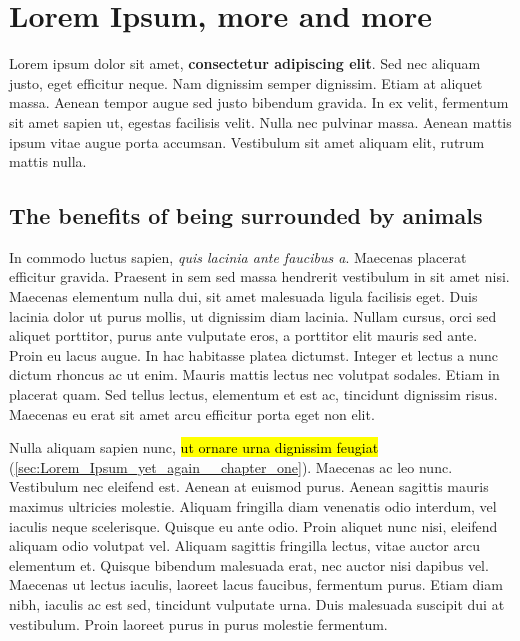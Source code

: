 \chapter{Lorem Ipsum, more and more}
\label{sec:Lorem_Ipsum,_more_and_more__chapter_two}

Lorem ipsum dolor sit amet, \textbf{consectetur adipiscing elit}. Sed nec aliquam justo, eget efficitur neque. Nam dignissim semper dignissim. Etiam at aliquet massa. Aenean tempor augue sed justo bibendum gravida. In ex velit, fermentum sit amet sapien ut, egestas facilisis velit. Nulla nec pulvinar massa. Aenean mattis ipsum vitae augue porta accumsan. Vestibulum sit amet aliquam elit, rutrum mattis nulla.

\section{The benefits of being surrounded by animals}
\label{sec:The_benefits_of_being_surrounded_by_animals__chapter_two}
In commodo luctus sapien, \textit{quis lacinia ante faucibus a}. Maecenas placerat efficitur gravida. Praesent in sem sed massa hendrerit vestibulum in sit amet nisi. Maecenas elementum nulla dui, sit amet malesuada ligula facilisis eget. Duis lacinia dolor ut purus mollis, ut dignissim diam lacinia. Nullam cursus, orci sed aliquet porttitor, purus ante vulputate eros, a porttitor elit mauris sed ante. Proin eu lacus augue. In hac habitasse platea dictumst. Integer et lectus a nunc dictum rhoncus ac ut enim. Mauris mattis lectus nec volutpat sodales. Etiam in placerat quam. Sed tellus lectus, elementum et est ac, tincidunt dignissim risus. Maecenas eu erat sit amet arcu efficitur porta eget non elit.

Nulla aliquam sapien nunc, \hl{ut ornare urna dignissim feugiat} (\autoref{sec:Lorem_Ipsum_yet_again__chapter_one}). Maecenas ac leo nunc. Vestibulum nec eleifend est. Aenean at euismod purus. Aenean sagittis mauris maximus ultricies molestie. Aliquam fringilla diam venenatis odio interdum, vel iaculis neque scelerisque. Quisque eu ante odio. Proin aliquet nunc nisi, eleifend aliquam odio volutpat vel. Aliquam sagittis fringilla lectus, vitae auctor arcu elementum et. Quisque bibendum malesuada erat, nec auctor nisi dapibus vel. Maecenas ut lectus iaculis, laoreet lacus faucibus, fermentum purus. Etiam diam nibh, iaculis ac est sed, tincidunt vulputate urna. Duis malesuada suscipit dui at vestibulum. Proin laoreet purus in purus molestie fermentum.
